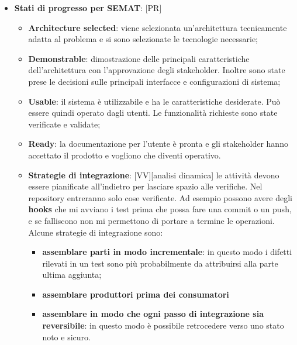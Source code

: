 \begin{itemize}
	\item \textbf{Stati di progresso per SEMAT}: [PR]
		\begin{itemize}
			\item \textbf{Architecture selected}: viene selezionata un'architettura tecnicamente adatta al problema e si sono selezionate le tecnologie necessarie;
			\item \textbf{Demonstrable}: dimostrazione delle principali caratteristiche dell'architettura con l'approvazione degli stakeholder. Inoltre sono state prese le decisioni sulle principali interfacce e configurazioni di sistema;
			\item \textbf{Usable}: il sistema è utilizzabile e ha le caratteristiche desiderate. Può essere quindi operato dagli utenti. Le funzionalità richieste sono state verificate e validate;
			\item \textbf{Ready}: la documentazione per l'utente è pronta e gli stakeholder hanno accettato il prodotto e vogliono che diventi operativo.


	\item \textbf{Strategie di integrazione}: [VV][analisi dinamica] le attività devono essere pianificate all'indietro per lasciare spazio alle verifiche. Nel repository entreranno solo cose verificate. Ad esempio possono avere degli \textbf{hooks} che mi avviano i test prima che possa fare una commit o un push, e se falliscono non mi permettono di portare a termine le operazioni. Alcune strategie di integrazione sono:
		\begin{itemize}
			\item \textbf{assemblare parti in modo incrementale}: in questo modo i difetti rilevati in un test sono più probabilmente da attribuirsi alla parte ultima aggiunta;
			\item \textbf{assemblare produttori prima dei consumatori}
			\item \textbf{assemblare in modo che ogni passo di integrazione sia reversibile}: in questo modo è possibile retrocedere verso uno stato noto e sicuro.
		\end{itemize}


\end{itemize}
\end{itemize}
